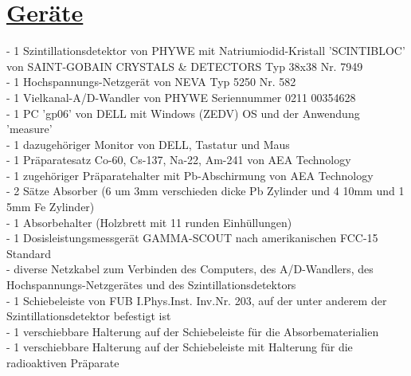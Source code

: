 \documentclass[11pt,a4paper]{article}
\begin{document}
 \section{\underline{Geräte}}
  - 1 Szintillationsdetektor von PHYWE mit Natriumiodid-Kristall 'SCINTIBLOC' von SAINT-GOBAIN CRYSTALS \& DETECTORS Typ 38x38 Nr. 7949
  \\- 1 Hochspannungs-Netzgerät von NEVA Typ 5250 Nr. 582
  \\- 1 Vielkanal-A/D-Wandler von PHYWE Seriennummer 0211 00354628
  \\- 1 PC 'gp06' von DELL mit Windows (ZEDV) OS und der Anwendung 'measure'
  \\- 1 dazugehöriger Monitor von DELL, Tastatur und Maus
  \\- 1 Präparatesatz Co-60, Cs-137, Na-22, Am-241 von AEA Technology
  \\- 1 zugehöriger Präparatehalter mit Pb-Abschirmung von AEA Technology
    \\- 2 Sätze Absorber (6 um 3mm verschieden dicke Pb Zylinder und 4 10mm und 1 5mm Fe Zylinder) 
  \\- 1 Absorbehalter (Holzbrett mit 11 runden Einhüllungen)
  \\- 1 Dosisleistungsmessgerät GAMMA-SCOUT nach amerikanischen FCC-15 Standard
  \\- diverse Netzkabel zum Verbinden des Computers, des A/D-Wandlers, des Hochspannungs-Netzgerätes und des Szintillationsdetektors
  \\- 1 Schiebeleiste von FUB I.Phys.Inst. Inv.Nr. 203, auf der unter anderem der Szintillationsdetektor befestigt ist
  \\- 1 verschiebbare Halterung auf der Schiebeleiste für die Absorbematerialien
  \\- 1 verschiebbare Halterung auf der Schiebeleiste mit Halterung für die radioaktiven Präparate
  
\end{document}
